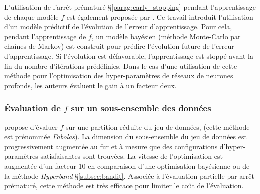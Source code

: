 L'utilisation de l'arrêt prématuré §\ref{parag:early_stopping} pendant l'apprentissage de chaque modèle $f$ est également proposée par \citeauthor{domhan_speeding_2015} \cite{domhan_speeding_2015}.
Ce travail introduit l'utilisation d'un modèle prédictif de l'évolution de l'erreur d'apprentissage.
Pour cela, pendant l'apprentissage de $f$, un modèle bayésien (méthode Monte-Carlo par chaînes de Markov) est construit pour prédire l'évolution future de l'erreur d'apprentissage.
Si l'évolution est défavorable, l'apprentissage est stoppé avant la fin du nombre d'itérations prédéfinies.
Dans le cas d'une utilisation de cette méthode pour l'optimisation des hyper-paramètres de réseaux de neurones profonds, les auteurs évaluent le gain à un facteur deux.

\subsubsection{Évaluation de $f$ sur un sous-ensemble des données} \label{subsec:subsampling}
\citeauthor{klein_fast_2016} \cite{klein_fast_2016} propose d'évaluer $f$ sur une partition réduite du jeu de données, (cette méthode est prénommée \textit{Fabolas}).
La dimension du sous-ensemble du jeu de données est progressivement augmentée au fur et à mesure que des configurations d'hyper-paramètres satisfaisantes sont trouvées.
La vitesse de l'optimisation est augmentée d'un facteur 10 en comparaison d'une optimisation bayésienne ou de la méthode \textit{Hyperband} §\ref{subsec:bandit}.
Associée à l'évaluation partielle par arrêt prématuré, cette méthode est très efficace pour limiter le coût de l'évaluation.

